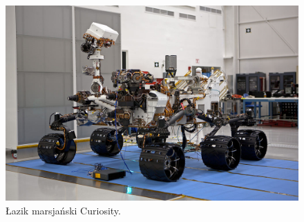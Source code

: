   \begin{figure}[H]
    \begin{center}
      \includegraphics[scale=0.8]{imgs/curiosity.png}
 \caption[Łazik marsjański \textit{Curiosity}]{\small{Łazik marsjański Curiosity.}\footnotemark}
        \label{lazik}
    \end{center}
  \end{figure}

